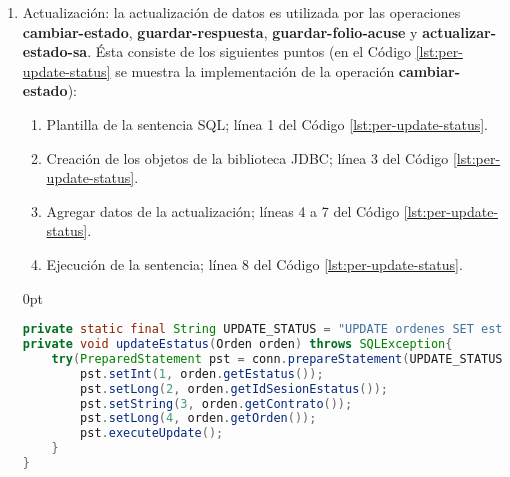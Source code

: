 \begin{enumerate}
\begin{adjustwidth}{\listingfixwidth}{0pt}
\begin{lstlisting}[language=Java, caption={Inserción de una nueva orden de reposición en la base de datos.}, captionpos=b, label={lst:per-insert-order}]
public void insertOrden(Orden orden) throws SQLException{
    try(PreparedStatement pst = conn.prepareStatement(INSERT_ORDEN)){
	    pst.setString(1, orden.getContrato());
	    ...
	    pst.setLong(9, orden.getIdSesionInsersion());
	    pst.executeUpdate();
	}
}
	\end{lstlisting}
	\end{adjustwidth}
	\item Actualización: la actualización de datos es utilizada por las operaciones \textbf{cambiar-estado}, \textbf{guardar-respuesta}, \textbf{guardar-folio-acuse} y \textbf{actualizar-estado-sa}. Ésta consiste de los siguientes puntos (en el Código \ref{lst:per-update-status} se muestra la implementación de la operación \textbf{cambiar-estado}):
	\begin{enumerate}
		\item Plantilla de la sentencia SQL; línea 1 del Código \ref{lst:per-update-status}.
		\item Creación de los objetos de la biblioteca JDBC; línea 3 del Código \ref{lst:per-update-status}.
		\item Agregar datos de la actualización; líneas 4 a 7 del Código \ref{lst:per-update-status}.
		\item Ejecución de la sentencia; línea 8 del Código \ref{lst:per-update-status}.
	\end{enumerate}
	\begin{adjustwidth}{\listingfixwidth}{0pt}
	\begin{lstlisting}[language=Java, caption={Actualización del estado de una orden de reposición.}, captionpos=b, label={lst:per-update-status}]
private static final String UPDATE_STATUS = "UPDATE ordenes SET estatus = ?, fecha_estatus = CURRENT_TIMESTAMP, id_sesion_estatus = ? WHERE contrato = ? AND orden = ?";
private void updateEstatus(Orden orden) throws SQLException{
	try(PreparedStatement pst = conn.prepareStatement(UPDATE_STATUS)){
		pst.setInt(1, orden.getEstatus());
		pst.setLong(2, orden.getIdSesionEstatus());
		pst.setString(3, orden.getContrato());
		pst.setLong(4, orden.getOrden());
		pst.executeUpdate();
	}
}
	\end{lstlisting}
	\end{adjustwidth}
\end{enumerate}
